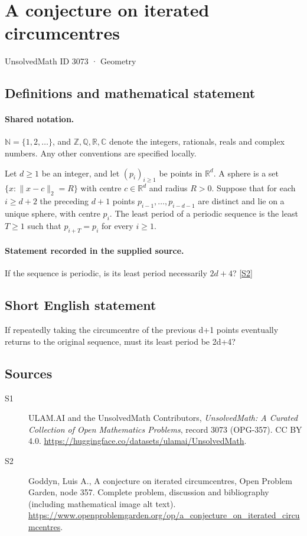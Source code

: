 \documentclass[11pt]{book}
\newcommand{\sref}[2]{\hyperlink{source:#1:#2}{[S#2]}}
\begin{document}
\setcounter{section}{3072}
\section{A conjecture on iterated circumcentres}\label{3073}
{\small\sffamily UnsolvedMath ID 3073 · Geometry}
\subsection{Definitions and mathematical statement}

\paragraph{Shared notation.}$\mathbb N=\{1,2,\ldots\}$, and $\mathbb Z,\mathbb Q,\mathbb R,\mathbb C$ denote the integers, rationals, reals and complex numbers. Any other conventions are specified locally.


Let $d\geq1$ be an integer, and let $(p_i)_{i\geq1}$ be points in $\mathbb R^d$. A sphere is a set $\{x:\|x-c\|_2=R\}$ with centre $c\in\mathbb R^d$ and radius $R>0$. Suppose that for each $i\geq d+2$ the preceding $d+1$ points $p_{i-1},\ldots,p_{i-d-1}$ are distinct and lie on a unique sphere, with centre $p_i$. The least period of a periodic sequence is the least $T\geq1$ such that $p_{i+T}=p_i$ for every $i\geq1$.
\paragraph{Statement recorded in the supplied source.}
If the sequence is periodic, is its least period necessarily $2d+4$? \sref{3073}{2}
\subsection{Short English statement}
If repeatedly taking the circumcentre of the previous d+1 points eventually returns to the original sequence, must its least period be 2d+4?
\subsection{Sources}
\begin{description}
\item[\hypertarget{source:3073:1}{S1}] ULAM.AI and the UnsolvedMath Contributors, \emph{UnsolvedMath: A Curated Collection of Open Mathematics Problems}, record 3073 (OPG-357). CC BY 4.0. \url{https://huggingface.co/datasets/ulamai/UnsolvedMath}.
\item[\hypertarget{source:3073:2}{S2}] Goddyn, Luis A., A conjecture on iterated circumcentres, Open Problem Garden, node 357. Complete problem, discussion and bibliography (including mathematical image alt text). \url{https://www.openproblemgarden.org/op/a_conjecture_on_iterated_circumcentres}.
\end{description}
\label{end:3073}
\end{document}
